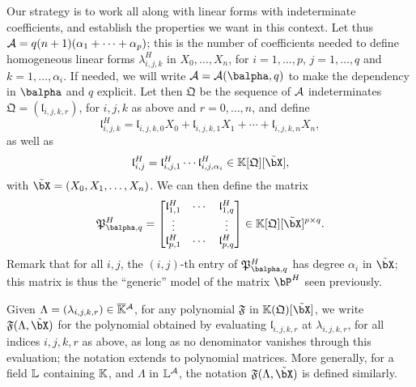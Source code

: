 \documentclass[12pt]{article}
\begin{document}
Our strategy is to work all along with linear forms with indeterminate
coefficients, and establish the properties we want in this context.
Let thus ${\cal A}=q(n+1)(\alpha_1 + \cdots + \alpha_p)$; this is the
number of coefficients needed to define homogeneous linear forms
$\lambda^H_{i,j,k}$ in $X_0,\dots,X_n$, for $i=1,\dots,p$,
$j=1,\dots,q$ and $k=1,\dots,\alpha_i$. If needed, we will write
${\cal A}={\cal A}(\balpha,q)$ to make the dependency in $\balpha$ and
$q$ explicit.  Let then $\mathfrak{Q}$ be the sequence of ${\cal A}$
indeterminates $\mathfrak{Q}=(\mathfrak{l}_{i,j,k,r})$, for $i,j,k$ as
above and $r=0,\dots,n$, and define
$$\mathfrak{l}^H_{i,j,k} = \mathfrak{l}_{i,j,k,0}X_0 + \mathfrak{l}_{i,j,k,1} X_1 +\cdots + \mathfrak{l}_{i,j,k,n} X_n,$$
as well as 
$$\mathfrak{l}^H_{i,j} = \mathfrak{l}^H_{i,j,1} \cdots \mathfrak{l}^H_{i,j,\alpha_i} \in \KK[\mathfrak{Q}][\tilde\bX],$$
with $\tilde\bX=(X_0,X_1,\dots,X_n)$. We can then define the
matrix
\begin{align}\label{eq:matM}
\mathfrak{P}^H_{\balpha,q}=\left [\begin{matrix}
\mathfrak{l}^H_{1,1} & \cdots & \mathfrak{l}^H_{1,q}\\
 \vdots & & \vdots\\
\mathfrak{l}^H_{p,1} & \cdots & \mathfrak{l}^H_{p,q}
  \end{matrix}\right ]\in \KK[\mathfrak{Q}][\tilde\bX]^{p\times q}.  
\end{align}
Remark that for all $i,j$, the $(i,j)$-th entry of
$\mathfrak{P}^H_{\balpha,q}$ has degree $\alpha_i$ in $\tilde \bX$;
this matrix is thus the ``generic'' model of the matrix $\bP^H$ seen previously.

Given $\Lambda=(\lambda_{i,j,k,r})\in \overline{\mathbb{K}}{}^{\cal A}$, for any polynomial
$\mathfrak{F}$ in $\KK(\mathfrak{Q})[\tilde \bX]$, we write
$\mathfrak{F}(\Lambda,\tilde\bX)$ for the polynomial obtained by
evaluating $\mathfrak{l}_{i,j,k,r}$ at $\lambda_{i,j,k,r}$, for all
indices $i,j,k,r$ as above, as long as no denominator vanishes through
this evaluation; the notation extends to polynomial matrices. More
generally, for a field $\mathbb{L}$ containing $\mathbb{K}$, and $\Lambda$ in $\mathbb{L}^{\cal A}$, the
notation $\mathfrak{F}(\Lambda,\tilde\bX)$ is defined similarly.
\end{document}
